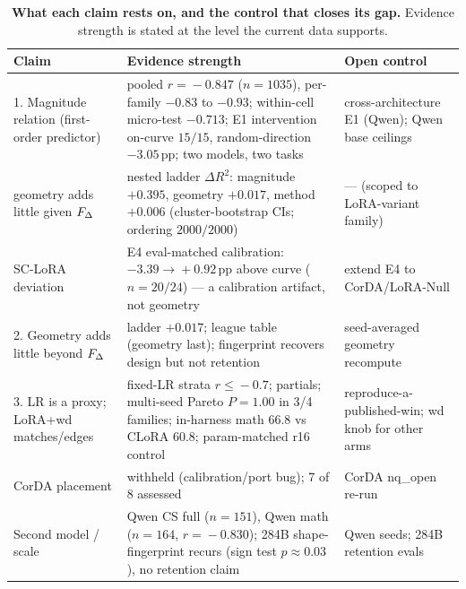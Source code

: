 \begin{table}[t]
\centering
\small
\setlength{\tabcolsep}{5pt}
\caption{\textbf{What each claim rests on, and the control that closes its gap.}
Evidence strength is stated at the level the current data supports.}
\label{tab:claims}
\begin{tabular}{p{} p{} p{}}
\toprule
Claim & Evidence strength & Open control \\
\midrule
1. Magnitude relation (first-order predictor) & pooled $r\!=\!-0.847$ ($n\!=\!1035$), per-family $-0.83$ to $-0.93$; within-cell micro-test $-0.713$; E1 intervention on-curve $15/15$, random-direction $-3.05$\,pp; two models, two tasks & cross-architecture E1 (Qwen); Qwen base ceilings \\
\quad geometry adds little given $F_{\Delta}$ & nested ladder $\Delta R^2$: magnitude $+0.395$, geometry $+0.017$, method $+0.006$ (cluster-bootstrap CIs; ordering $2000/2000$) & --- (scoped to LoRA-variant family) \\
\quad SC-LoRA deviation & E4 eval-matched calibration: $-3.39\!\to\!+0.92$\,pp above curve ($n\!=\!20/24$) --- a calibration artifact, not geometry & extend E4 to CorDA/LoRA-Null \\
2. Geometry adds little beyond $F_{\Delta}$ & ladder $+0.017$; league table (geometry last); fingerprint recovers design but not retention & seed-averaged geometry recompute \\
3. LR is a proxy; LoRA{+}wd matches/edges & fixed-LR strata $r\!\le\!-0.7$; partials; multi-seed Pareto $P\!=\!1.00$ in 3/4 families; in-harness math $66.8$ vs CLoRA $60.8$; param-matched r16 control & reproduce-a-published-win; wd knob for other arms \\
\quad CorDA placement & withheld (calibration/port bug); 7 of 8 assessed & CorDA nq\_open re-run \\
Second model / scale & Qwen CS full ($n\!=\!151$), Qwen math ($n\!=\!164$, $r\!=\!-0.830$); 284B shape-fingerprint recurs (sign test $p\!\approx\!0.03$), no retention claim & Qwen seeds; 284B retention evals \\
\bottomrule
\end{tabular}
\end{table}
